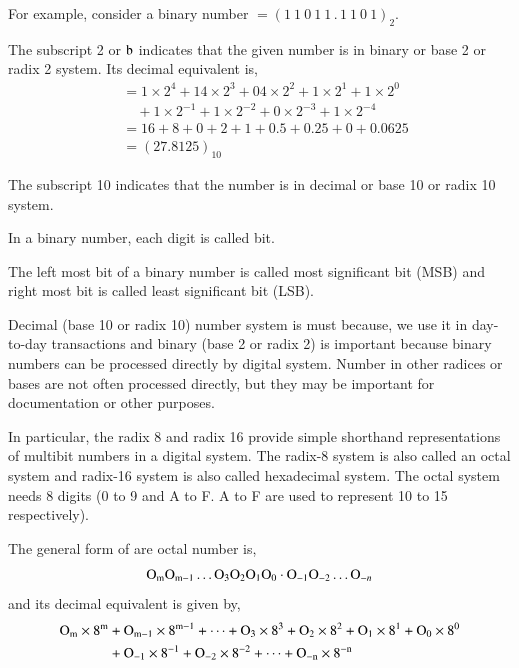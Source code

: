 For example, consider a binary number $=(1~1~0~1~1\,.\,1~1~0~1)_{2}$.

\eject

The subscript 2 or $\textrm{b}$ indicates that the given number is in binary or base 2 or radix 2 system. Its decimal equivalent is,
\begin{align*}
&= 1\times 2^{4}+14\times 2^{3}+04\times 2^{2}+1\times 2^{1}+1\times 2^{0}\\
&\quad +1\times 2^{-1}+1\times 2^{-2}+0\times 2^{-3}+1\times 2^{-4}\\
&=16+8+0+2+1+0.5+0.25+0+0.0625\\
&=(27.8125)_{10}
\end{align*}

The subscript 10 indicates that the number is in decimal or base 10 or radix 10 system.

In a binary number, each digit is called bit.

The left most bit of a binary number is called most significant bit (MSB) and right most bit is called least significant bit (LSB).

\smallskip
{}

Decimal (base 10 or radix 10) number system is must because, we use it in day-to-day transactions and binary (base 2 or radix 2) is important because binary numbers can be processed directly by digital system. Number in other radices or bases are not often processed directly, but they may be important for documentation or other purposes.

In particular, the radix 8 and radix 16 provide simple shorthand representations of multibit numbers in a digital system. The radix-8 system is also called an octal system and radix-16 system is also called hexadecimal system. The octal system needs 8 digits (0 to 9 and A to F. A to F are used to represent 10 to 15 respectively).

The general form of are octal number is,
$$
\textrm{O}_{\textrm{m}}\textrm{O}_{\textrm{m}-1}\ldots \textrm{O}_{3}\textrm{O}_{2}\textrm{O}_{1}\textrm{O}_{0}\cdot \textrm{O}_{-1}\textrm{O}_{-2}\ldots \textrm{O}_{-n}
$$
and its decimal equivalent is given by,
\begin{align*}
\textrm{O}_{\textrm{m}}\times 8^{\textrm{m}} &+ \textrm{O}_{\textrm{m}-1}\times 8^{\textrm{m}-1}+\cdots+\textrm{O}_{3}\times 8^{3}+\textrm{O}_{2}\times 8^{2}+\textrm{O}_{1}\times 8^{1}+\textrm{O}_{0}\times 8^{0}\\
&+ \textrm{O}_{-1}\times 8^{-1}+\textrm{O}_{-2}\times 8^{-2}+\cdots+\textrm{O}_{-\textrm{n}}\times 8^{-\textrm{n}}
\end{align*}

